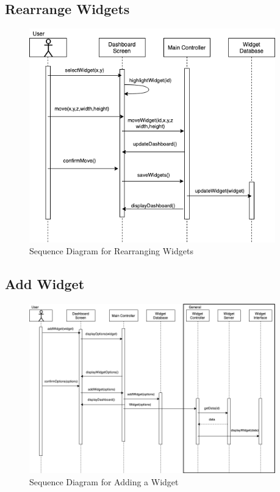 \documentclass[]{article}
\begin{document}
\subsection{Rearrange Widgets}
\label{sub:rearrange_seq}
\begin{figure}[H]
\begin{center}
\includegraphics[width=0.95\textwidth]{D3/images/RearrangeWidgets.png}
\end{center}
\caption{Sequence Diagram for Rearranging Widgets}
\label{fig:Rearrange Widget}
\end{figure}

\subsection{Add Widget}
\label{sub:add_widget_seq}
\begin{figure}[H]
\begin{center}
\includegraphics[width=0.95\textwidth]{D3/images/AddWidget.png}
\end{center}
\caption{Sequence Diagram for Adding a Widget}
\label{fig:Add Widget}
\end{figure}
\end{document}
